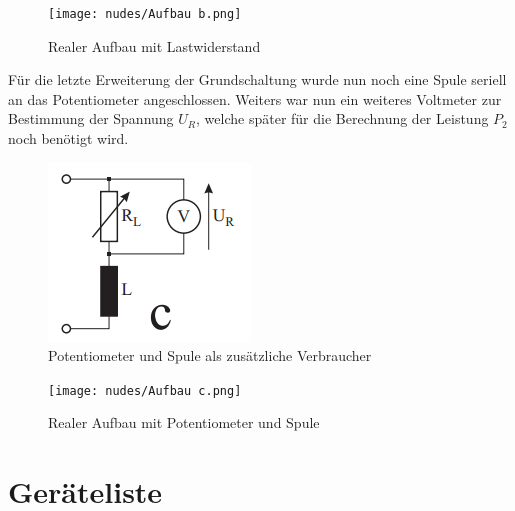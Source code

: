 \documentclass[12pt,a4paper,twoside]{article}
\begin{document}
\begin{figure}[H]
    \centering
    \texttt{[image: nudes/Aufbau b.png]}
    \caption{Realer Aufbau mit Lastwiderstand}
    \label{fig:RealerAufbauB}
\end{figure}

\noindent
Für die letzte Erweiterung der Grundschaltung wurde nun noch eine Spule seriell an das Potentiometer angeschlossen. Weiters war nun ein weiteres Voltmeter zur Bestimmung der Spannung $U_{R}$, welche später für die Berechnung der Leistung $P_{2}$ noch benötigt wird.

\begin{figure}[H]
    \centering
    \includegraphics[width=0.2\linewidth, angle=0]{nudes/Versuchsaufbau c.png}
    \caption{Potentiometer und Spule als zusätzliche Verbraucher}
    \label{fig:AufbauC}
\end{figure}

\begin{figure}[H]
    \centering
    \texttt{[image: nudes/Aufbau c.png]}
    \caption{Realer Aufbau mit Potentiometer und Spule}
    \label{fig:RealerAufbauC}
\end{figure}



\section{Geräteliste} %
\end{document}
